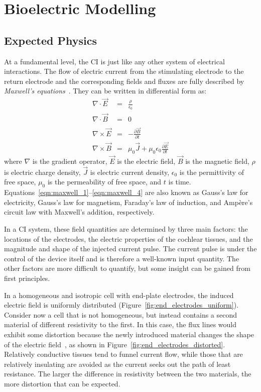 
\section{Bioelectric Modelling}

\subsection{Expected Physics}
\label{sect:expected_physics}

At a fundamental level, the CI is just like any other system of electrical
interactions. The flow of electric current from the stimulating electrode to the
return electrode and the corresponding fields and fluxes are fully described by
\emph{Maxwell's equations}~\cite{maxwell1865}. They can be written in
differential form as:
\begin{eqnarray}
	\nabla \cdot \vec{E} &=& \frac{\rho}{\epsilon_0}
		\label{eqn:maxwell_1} \\
	\nabla \cdot \vec{B} &=& 0 \phantom{\frac{1}{1}}\\
	\nabla \times \vec{E} &=& -	\frac{\partial \vec{B}}{\partial t} \\
	\nabla \times \vec{B} &=& \mu_{0}\vec{J} +
		\mu_{0}\epsilon_{0}\frac{\partial \vec{E}}{\partial t}
		\label{eqn:maxwell_4}
\end{eqnarray}
where $ \nabla $ is the gradient operator, $ \vec{E} $ is the electric field,
$ \vec{B} $ is the magnetic field, $ \rho $ is electric charge density, $
\vec{J} $ is electric current density, $ \epsilon_{0} $ is the permittivity of
free space, $ \mu_{0} $ is the permeability of free space, and $ t $ is time.
Equations~\ref{eqn:maxwell_1}--\ref{eqn:maxwell_4} are also known as Gauss's
law for electricity, Gauss's law for magnetism, Faraday's law of induction, and
Amp{\`e}re's circuit law with Maxwell's addition, respectively.

In a CI system, these field quantities are determined by three main factors: the
locations of the electrodes, the electric properties of the cochlear tissues,
and the magnitude and shape of the injected current pulse. The current pulse is
under the control of the device itself and is therefore a well-known input
quantity. The other factors are more difficult to quantify, but some insight can
be gained from first principles.

In a homogeneous and isotropic cell with end-plate electrodes, the induced
electric field is uniformly distributed
(Figure~\ref{fig:end_electrodes_uniform}). Consider now a cell that is not
homogeneous, but instead contains a second material of different resistivity to
the first. In this case, the flux lines would exhibit some distortion because
the newly introduced material changes the shape of the electric
field~\cite{baker1989}, as shown in Figure~\ref{fig:end_electrodes_distorted}.
Relatively conductive tissues tend to funnel current flow, while those that are
relatively insulating are avoided as the current seeks out the path of least
resistance. The larger the difference in resistivity between the two materials,
the more distortion that can be expected.

